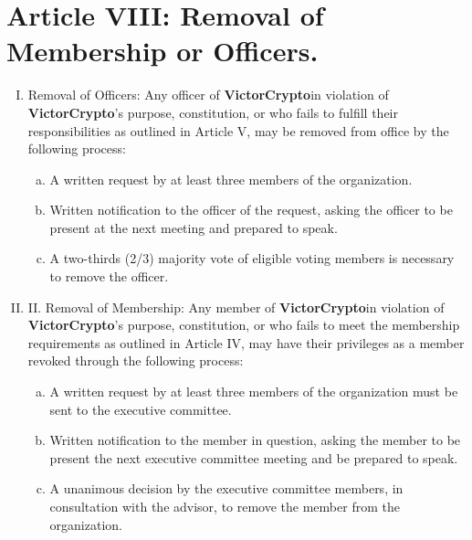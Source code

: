 \documentclass[11pt]{article}
\newcommand{\orgname}{\textbf{VictorCrypto}}
\begin{document}
    \section{Article VIII: Removal of Membership or Officers.}

    \begin{enumerate}[I.]
        \item Removal of Officers: Any officer of \orgname in violation of \orgname's purpose, constitution, or who
        fails to fulfill their responsibilities as outlined in Article V, may be removed from office by the following process:
        \begin{enumerate}[a.]
            \item A written request by at least three members of the organization.
            \item Written notification to the officer of the request, asking the officer to be present at the next meeting and prepared to speak.
            \item A two-thirds (2/3) majority vote of eligible voting members is necessary to remove the officer.
        \end{enumerate}
        \item II. Removal of Membership: Any member of \orgname in violation of \orgname's purpose, constitution, or
        who fails to meet the membership requirements as outlined in Article IV, may have their privileges as a member revoked through the following process:
        \begin{enumerate}[a.]
            \item A written request by at least three members of the organization must be sent to the executive
            committee.
            \item Written notification to the member in question, asking the member to be present the next executive
            committee meeting and be prepared to speak.
            \item A unanimous decision by the executive committee members, in consultation with the advisor, to remove
            the member from the organization.
        \end{enumerate}
    \end{enumerate}
\end{document}
